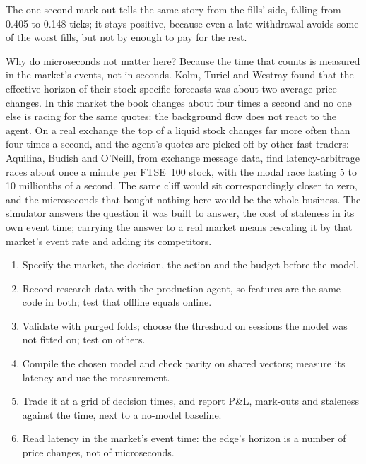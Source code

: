 The one-second mark-out tells the same story from the fills' side, falling from 0.405 to 0.148 ticks; it stays positive, because
even a late withdrawal avoids some of the worst fills, but not by enough to pay for the rest.

Why do microseconds not matter here? Because the time that counts is measured in the market's events, not in seconds. Kolm,
Turiel and Westray found that the effective horizon of their stock-specific forecasts was about two average price changes. In this
market the book changes about four times a second and no one else is racing for the same quotes: the background flow does not
react to the agent. On a real exchange the top of a liquid stock changes far more often than four times a second, and the agent's quotes are
picked off by other fast traders: Aquilina, Budish and O'Neill, from exchange message data, find latency-arbitrage races about
once a minute per FTSE~100 stock, with the modal race lasting 5 to 10 millionths of a second. The same cliff would sit
correspondingly closer to zero, and the microseconds that bought nothing here would be the whole business. The simulator
answers the question it was built to answer, the cost of staleness in its own event time; carrying the answer to a real market
means rescaling it by that market's event rate and adding its competitors.

\begin{method}\label{met:ml:lob:method}
\begin{enumerate}
\item Specify the market, the decision, the action and the budget before the model.
\item Record research data with the production agent, so features are the same code in both; test that offline equals online.
\item Validate with purged folds; choose the threshold on sessions the model was not fitted on; test on others.
\item Compile the chosen model and check parity on shared vectors; measure its latency and use the measurement.
\item Trade it at a grid of decision times, and report P\&L, mark-outs and staleness against the time, next to a no-model baseline.
\item Read latency in the market's event time: the edge's horizon is a number of price changes, not of microseconds.
\end{enumerate}
\end{method}

